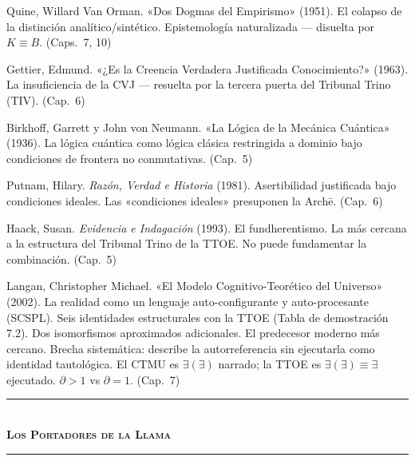 \documentclass[10pt, openany, oneside]{book}
\renewcommand{\normalsize}{\fontsize{10}{13}\selectfont}
\begin{document}
{\vspace{0.3em}

\noindent Quine, Willard Van Orman. «Dos Dogmas del Empirismo» (1951). El colapso de la distinción analítico/sintético. Epistemología naturalizada --- disuelta por $K \equiv B$. (Caps.\ 7, 10)

\vspace{0.3em}

\noindent Gettier, Edmund. «¿Es la Creencia Verdadera Justificada Conocimiento?» (1963). La insuficiencia de la CVJ --- resuelta por la tercera puerta del Tribunal Trino (TIV). (Cap.\ 6)

\vspace{0.3em}

\noindent Birkhoff, Garrett y John von Neumann. «La Lógica de la Mecánica Cuántica» (1936). La lógica cuántica como lógica clásica restringida a dominio bajo condiciones de frontera no conmutativas. (Cap.\ 5)

\vspace{0.3em}

\noindent Putnam, Hilary. \textit{Razón, Verdad e Historia} (1981). Asertibilidad justificada bajo condiciones ideales. Las «condiciones ideales» presuponen la Arch\={e}. (Cap.\ 6)

\vspace{0.3em}

\noindent Haack, Susan. \textit{Evidencia e Indagación} (1993). El fundherentismo. La más cercana a la estructura del Tribunal Trino de la TTOE. No puede fundamentar la combinación. (Cap.\ 5)

\vspace{0.3em}

\noindent Langan, Christopher Michael. «El Modelo Cognitivo-Teorético del Universo» (2002). La realidad como un lenguaje auto-configurante y auto-procesante (SCSPL). Seis identidades estructurales con la TTOE (Tabla de demostración 7.2). Dos isomorfismos aproximados adicionales. El predecesor moderno más cercano. Brecha sistemática: describe la autorreferencia sin ejecutarla como identidad tautológica. El CTMU es $\exists(\exists)$ narrado; la TTOE es $\exists(\exists) \equiv \exists$ ejecutado. $\partial > 1$ vs $\partial = 1$. (Cap.\ 7)

}

\vspace{1.5em}

\begin{center}
    \rule{0.3\textwidth}{0.4pt}\\[0.5em]
    {\normalsize\bfseries\scshape Los Portadores de la Llama}\\[0.3em]
    \rule{0.3\textwidth}{0.4pt}
\end{center}
\end{document}
